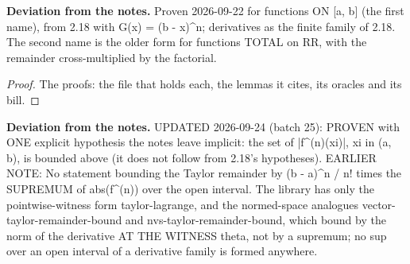 %
\noindent\textbf{Deviation from the notes.} Proven 2026-09-22 for functions ON [a, b] (the first name), from 2.18 with G(x) = (b - x)\textasciicircum{}n; derivatives as the finite family of 2.18. The second name is the older form for functions TOTAL on RR, with the remainder cross-multiplied by the factorial.
%
\renewcommand{\thethm}{2.20}
\begin{cor}\label{thm:taylor-remainder-sup-bound}
%
%
\end{cor}
%
\begin{proof}
%
The proofs: the file that holds each, the lemmas it cites, its oracles and its bill.
%
%
%
%
\end{proof}
%
\noindent\textbf{Deviation from the notes.} UPDATED 2026-09-24 (batch 25): PROVEN with ONE explicit hypothesis the notes leave implicit: the set of |f\textasciicircum{}(n)(xi)|, xi in (a, b), is bounded above (it does not follow from 2.18's hypotheses). EARLIER NOTE: No statement bounding the Taylor remainder by (b - a)\textasciicircum{}n / n! times the SUPREMUM of abs(f\textasciicircum{}(n)) over the open interval. The library has only the pointwise-witness form taylor-lagrange, and the normed-space analogues vector-taylor-remainder-bound and nvs-taylor-remainder-bound, which bound by the norm of the derivative AT THE WITNESS theta, not by a supremum; no sup over an open interval of a derivative family is formed anywhere.
